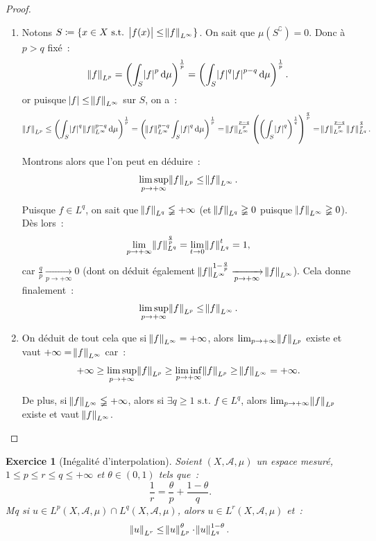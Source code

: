 \documentclass{article}
\newtheorem{ex}{Exercice}[section]
\newcommand{\pinfty}{{+\infty}}
\newcommand{\st}{\text{ s.t. }}
\newcommand{\C}{\complement}
\begin{document}
\begin{proof}
\begin{enumerate}
\begin{enumerate}
		\item Notons $S \coloneqq \{x \in X \st \abs {f(x)} \leq \norm f_{L^\infty}\}$. On sait que $\mu(S^\C) = 0$. Donc à $p > q$ fixé~:
		\[\norm f_{L^p} = \left(\int_S \abs f^p\dif\mu\right)^{\frac 1p} = \left(\int_S \abs f^q\abs f^{p-q}\dif\mu\right)^{\frac 1p}.\]
		or puisque $\abs f \leq \norm f_{L^\infty}$ sur $S$, on a~:
		\[\norm f_{L^p} \leq \left(\int_S\abs f^q\norm f_{L^\infty}^{p-q}\dif\mu\right)^{\frac 1p} = \left(\norm f_{L^\infty}^{p-q}\int_S\abs f^q\dif\mu\right)^{\frac 1p}
		= \norm f_{L^\infty}^{\frac {p-q}p}\left(\left(\int_S \abs f^q\right)^{\frac 1q}\right)^{\frac qp} = \norm f_{L^\infty}^{\frac {p-q}p}\norm f_{L^q}^{\frac qp}.\]

		Montrons alors que l'on peut en déduire~:
		\[\limsup_{p \to \pinfty}\norm f_{L^p} \leq \norm f_{L^\infty}.\]

		Puisque $f \in L^q$, on sait que $\norm f_{L^q} \lneqq \pinfty$ (et $\norm f_{L^q} \gneqq 0$ puisque $\norm f_{L^\infty} \gneqq 0$). Dès lors~:
		\[\lim_{p \to \pinfty}\norm f_{L^q}^{\frac qp} = \lim_{t \to 0}\norm f_{L^q}^t = 1,\]
		car $\frac qp \xrightarrow[p \to \pinfty]{} 0$ (dont on déduit également $\norm f_{L^\infty}^{1-\frac qp} \xrightarrow[p \to \pinfty]{} \norm f_{L^\infty}$). Cela donne
		finalement~:
		\[\limsup_{p \to \pinfty}\norm f_{L^p} \leq \norm f_{L^\infty}.\]

		\item On déduit de tout cela que si $\norm f_{L^\infty} = \pinfty$, alors $\lim_{p \to \pinfty}\norm f_{L^p}$ existe et vaut $\pinfty = \norm f_{L^\infty}$ car~:
		\[\pinfty \geq \limsup_{p \to \pinfty}\norm f_{L^p} \geq \liminf_{p \to \pinfty}\norm f_{L^p} \geq \norm f_{L^\infty} = \pinfty.\]


		De plus, si $\norm f_{L^\infty} \lneqq \pinfty$, alors si $\exists q \geq 1 \st f \in L^q$, alors $\lim_{p \to \pinfty} \norm f_{L^p}$ existe et vaut $\norm f_{L^\infty}$.

		\end{enumerate}
\end{enumerate}
\end{proof}

\begin{ex}[Inégalité d'interpolation] Soient $(X, \mathcal A, \mu)$ un espace mesuré, $1 \leq p \leq r \leq q \leq \pinfty$ et $\theta \in (0, 1)$ tels que~:
\[\frac 1r = \frac \theta p + \frac {1-\theta}q.\]
Mq si $u \in L^p(X, \mathcal A, \mu) \cap L^q(X, \mathcal A, \mu)$, alors $u \in L^r(X, \mathcal A, \mu)$ et~:
\[\norm u_{L^r} \leq \norm u_{L^p}^\theta \cdot \norm u_{L^q}^{1-\theta}.\]
\end{ex}
\end{document}
